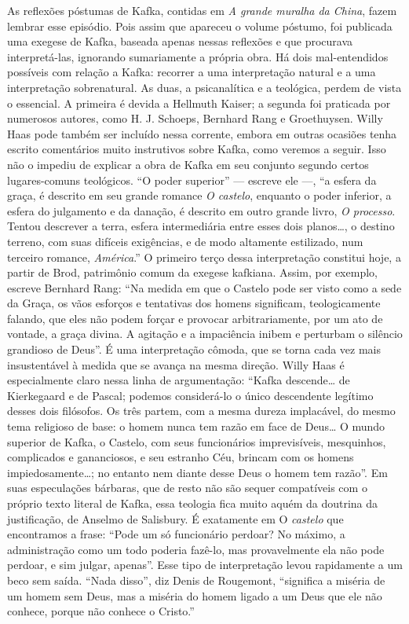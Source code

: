 As reflexões póstumas de Kafka, contidas em \textit{A grande muralha da China},
fazem lembrar esse episódio. Pois assim que apareceu o volume póstumo,
foi publicada uma exegese de Kafka, baseada apenas nessas reflexões e
que procurava interpretá-las, ignorando sumariamente a própria obra. Há
dois mal-entendidos possíveis com relação a Kafka: recorrer a uma
interpretação natural e a uma interpretação sobrenatural. As duas, a
psicanalítica e a teológica, perdem de vista o essencial. A primeira é
devida a Hellmuth Kaiser; a segunda foi praticada por numerosos autores,
como H. J. Schoeps, Bernhard Rang e Groethuysen. Willy Haas pode também
ser incluído nessa corrente, embora em outras ocasiões tenha escrito
comentários muito instrutivos sobre Kafka, como veremos a seguir. Isso
não o impediu de explicar a obra de Kafka em seu conjunto segundo certos
lugares-comuns teológicos. ``O poder superior'' --- escreve ele ---, ``a
esfera da graça, é descrito em seu grande romance \textit{O castelo}, enquanto
o poder inferior, a esfera do julgamento e da danação, é descrito em
outro grande livro, \textit{O processo}. Tentou descrever a terra, esfera
intermediária entre esses dois planos\ldots{}, o destino terreno, com suas
difíceis exigências, e de modo altamente estilizado, num terceiro
romance, \textit{América}.'' O primeiro terço dessa interpretação constitui
hoje, a partir de Brod, patrimônio comum da exegese kafkiana. Assim, por
exemplo, escreve Bernhard Rang: ``Na medida em que o Castelo pode ser
visto como a sede da Graça, os vãos esforços e tentativas dos homens
significam, teologicamente falando, que eles não podem forçar e provocar
arbitrariamente, por um ato de vontade, a graça divina. A agitação e a
impaciência inibem e perturbam o silêncio grandioso de Deus''. É uma
interpretação cômoda, que se torna cada vez mais insustentável à medida
que se avança na mesma direção. Willy Haas é especialmente claro nessa
linha de argumentação: ``Kafka descende\ldots{} de Kierkegaard e de Pascal;
podemos considerá-lo o único descendente legítimo desses dois filósofos.
Os três partem, com a mesma dureza implacável, do mesmo tema religioso
de base: o homem nunca tem razão em face de Deus\ldots{} O mundo superior de
Kafka, o Castelo, com seus funcionários imprevisíveis, mesquinhos,
complicados e gananciosos, e seu estranho Céu, brincam com os homens
impiedosamente\ldots{}; no entanto nem diante desse Deus o homem tem razão''.
Em suas especulações bárbaras, que de resto não são sequer compatíveis
com o próprio texto literal de Kafka, essa teologia fica muito aquém da
doutrina da justificação, de Anselmo de Salisbury. É exatamente em O
\textit{castelo} que encontramos a frase: ``Pode um só funcionário perdoar? No
máximo, a administração como um todo poderia fazê-lo, mas provavelmente
ela não pode perdoar, e sim julgar, apenas''. Esse tipo de interpretação
levou rapidamente a um beco sem saída. ``Nada disso'', diz Denis de
Rougemont, ``significa a miséria de um homem sem Deus, mas a miséria do
homem ligado a um Deus que ele não conhece, porque não conhece o
Cristo.''

